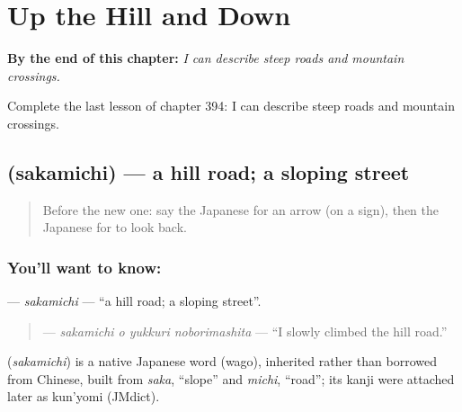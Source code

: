 
\chapter{Up the Hill and Down}
\label{ch:ja-up-the-hill-and-down}

\begin{chapteropening}
\textbf{By the end of this chapter:} \emph{I can describe steep roads and mountain crossings.}

Complete the last lesson of chapter 394: I can describe steep roads and mountain crossings.
\end{chapteropening}

\section[\texorpdfstring{\ja{さかみち} (sakamichi)}{さかみち (sakamichi)}]{ (sakamichi) — a hill road; a sloping street}

\label{lesson:JA-C394-sakamichi}



\begin{quote}
Before the new one: say the Japanese for an arrow (on a sign), then the Japanese for to look back.
\end{quote}

\subsection*{You'll want to know: }
\textbf{} — \emph{sakamichi} — \textquotedblleft{}a hill road; a sloping street\textquotedblright{}.

\begin{quote}
\textbf{  } — \emph{sakamichi o yukkuri noborimashita} — \textquotedblleft{}I slowly climbed the hill road.\textquotedblright{}
\end{quote}

\begin{cousinweb}
\textbf{} (\emph{sakamichi}) is a native Japanese word (wago), inherited rather than borrowed from Chinese, built from \emph{saka}, \textquotedblleft{}slope\textquotedblright{} and \emph{michi}, \textquotedblleft{}road\textquotedblright{}; its kanji were attached later as kun'yomi (JMdict).
\end{cousinweb}


